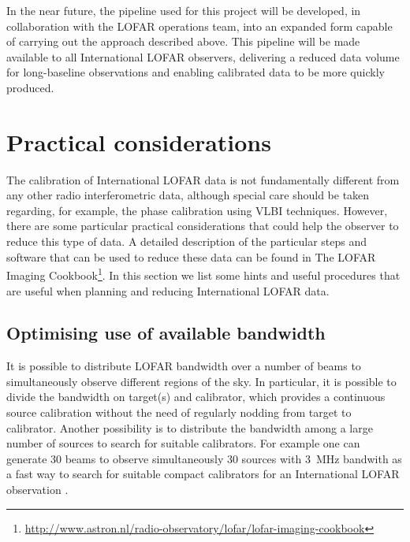 \documentclass[graybox]{svmult}
\begin{document}
In the near future, the pipeline used for this project will be developed, in
collaboration with the LOFAR operations team, into an expanded form capable of
carrying out the approach described above.  This pipeline will be made available
to all International LOFAR observers, delivering a reduced data volume for
long-baseline observations and enabling calibrated data to be more quickly
produced.


\section{Practical considerations}
\label{sect:practical}

The calibration of International LOFAR data is not fundamentally different from
any other radio interferometric data, although special care should be taken
regarding, for example, the phase calibration using VLBI techniques. However,
there are some particular practical considerations that could help the observer
to reduce this type of data. A detailed description of the particular steps and
software that can be used to reduce these data can be found in The LOFAR
Imaging
Cookbook\footnote{\url{http://www.astron.nl/radio-observatory/lofar/lofar-imaging-cookbook}}.
In this section we list some hints and useful procedures that are useful when planning and
reducing International LOFAR data.


\subsection{Optimising use of available bandwidth}\label{sec:bandwidth}
It is possible to distribute LOFAR bandwidth over a number of beams to
simultaneously observe different regions of the sky. In particular, it is
possible to divide the bandwidth on target(s) and calibrator, which provides a
continuous source calibration without the need of regularly nodding from target
to calibrator. Another possibility is to distribute the bandwidth among a large
number of sources to search for suitable calibrators. For example one can
generate 30 beams to observe simultaneously 30 sources with 3~MHz bandwith as a
fast way to search for suitable compact calibrators for an
International LOFAR observation \citep[see i.e.][]{moldon15}. 
\end{document}
